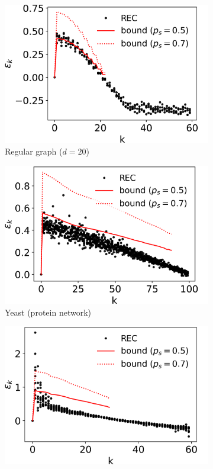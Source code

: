 \begin{figure}[ht]
	\centering
	\begin{subfigure}{0.33\textwidth}
		\includegraphics[width=\linewidth]{gfx/cons/example/regular.png}
		\caption{Regular graph ($d = 20$)}\label{fig:cons:example:regular}
	\end{subfigure}%
	\begin{subfigure}{0.33\textwidth}
		\includegraphics[width=\linewidth]{gfx/cons/example/yeast.png}
		\caption{Yeast (protein network)}\label{fig:cons:example:yeast}
	\end{subfigure}%
	\begin{subfigure}{0.33\textwidth}
		\includegraphics[width=\linewidth]{gfx/cons/example/bunny.png}

\end{subfigure}
\end{figure}
